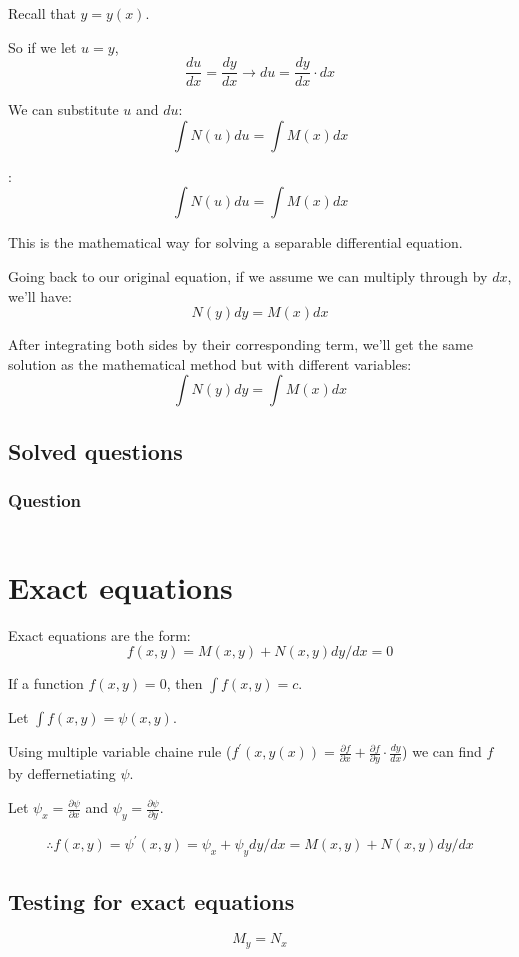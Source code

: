\documentclass{book}
\begin{document}
Recall that \(y = y(x)\).

So if we let \(u = y\), \[\frac{du}{dx} = \frac{dy}{dx} \rightarrow {du} = \frac{dy}{dx} \cdot {dx}\]

We can substitute \(u\) and \({du}\):
\[\int N(u) {du} = \int M(x) {dx}\]

:
\[\int N(u) {du} = \int M(x) {dx}\]

This is the mathematical way for solving a separable differential equation.

Going back to our original equation, if we assume we can multiply through by \({dx}\), we'll have:
\[N(y) {dy} = M(x) {dx}\]

After integrating both sides by their corresponding term, we'll get the same solution as the mathematical method but with different variables:
\[\int N(y) {dy} = \int M(x) {dx}\]

\subsection{Solved questions}
\subsubsection{Question}

\[\]

\section{Exact equations}
Exact equations are the form:
\[f(x, y) = M(x, y) + N(x, y) {dy}/{dx} = 0\]

If a function \(f(x, y) = 0\), then \(\int f(x, y) = c\).

Let \(\int f(x, y) = \psi(x, y)\).

Using multiple variable chaine rule (\(f^'(x, y(x)) = \frac{\partial f}{\partial x} + \frac{\partial f}{\partial y} \cdot \frac{dy}{dx} \)) we can find \(f\) by deffernetiating \(\psi\).

Let \(\psi_x = \frac{\partial \psi}{\partial x}\)
and \(\psi_y = \frac{\partial \psi}{\partial y}\).

\[\therefore f(x, y) = \psi^'(x, y) = \psi_x + \psi_y {dy}/{dx} = M(x, y) + N(x, y) {dy}/{dx}\]

\subsection{Testing for exact equations}
\[M_y = N_x\]
\end{document}
